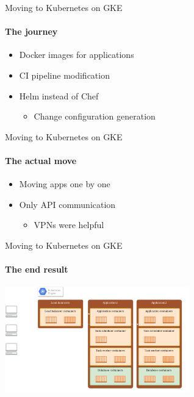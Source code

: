 \documentclass[14pt]{beamer}
\begin{document}
  \begin{frame}{Moving to Kubernetes on GKE}
  \framesubtitle{The journey}
  \begin{itemize}
    \item Docker images for applications
    \item CI pipeline modification
    \item Helm instead of Chef
    \begin{itemize}
      \item Change configuration generation
    \end{itemize}
  \end{itemize}
  \end{frame}

  \begin{frame}{Moving to Kubernetes on GKE}
  \framesubtitle{The actual move}
  \begin{itemize}
    \item Moving apps one by one
    \item Only API communication
    \begin{itemize}
      \item VPNs were helpful
    \end{itemize}
  \end{itemize}
  \end{frame}

  \begin{frame}{Moving to Kubernetes on GKE}
  \framesubtitle{The end result}
  \centering
  \includegraphics[width=8cm]{images/kubernetes_diagram.png}
  \end{frame}
\end{document}
